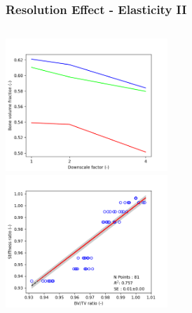 \documentclass[xcolor=table,11pt]{beamer}
\begin{document}
	\begin{frame}
		\frametitle{Resolution Effect - Elasticity II}

		\begin{columns}
			\centering
			\includegraphics[height=5cm]{02_ResolutionEffect/Results/BVTV_Downscaling}\\

			\centering
			\includegraphics[height=5cm]{02_ResolutionEffect/Results/BVTV_Stiffness}\\
		\end{columns}

	\end{frame}
\end{document}
